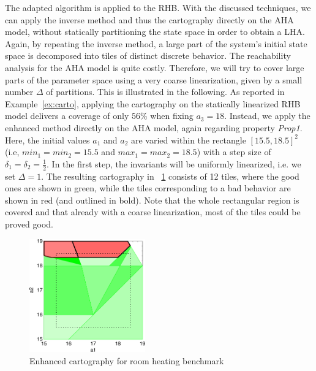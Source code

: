 \documentclass{llncs}
\begin{document}
\begin{example}
  The adapted algorithm is applied to the RHB. With the discussed
  techniques, we can apply the inverse method and thus the cartography
  directly on the AHA model, without statically partitioning the
  state space in order to obtain a LHA. 
%
  Again, by repeating the inverse method, a
  large part of the system's initial state space is decomposed
  into tiles of distinct discrete behavior. The reachability analysis
  for the AHA model is quite costly. Therefore, we will try to cover
  large parts of the parameter space using a very coarse
  linearization, given by a small number $\Delta$ of partitions.  This
  is illustrated in the following.
%
As reported in Example~\ref{ex:carto},
 applying the cartography on
  the statically linearized RHB model delivers a coverage
of only $56\%$
  when fixing $a_3 = 18$. Instead, we apply the enhanced method
  directly on the AHA model, again regarding property
  \textit{Prop1}. Here, the initial values $a_1$ and $a_2$ are varied
  within the rectangle $[15.5,18.5]^2$ (i.e, $min_1=min_2=15.5$ and
  $max_1=max_2=18.5$) with a step size of
  $\delta_1=\delta_2=\frac{1}{2}$. In the first step, the invariants
  will be uniformly linearized, i.e. we set $\Delta=1$.
%
  The resulting cartography in \figurename~\ref{fig:rhbcart}
  consists of 12 tiles, where the good ones are shown in green,
  while the tiles corresponding to a bad behavior are shown in red
  (and outlined in bold). Note that the whole rectangular region is
  covered and that already with a coarse linearization,
  most of the tiles could be proved good. %
  \begin{figure}[t]
    \centering
    \includegraphics[width=5cm]{images/good-bad.pdf}
    \caption{Enhanced cartography for room heating benchmark}\label{fig:rhbcart}
  \end{figure}

\end{example}
\end{document}
